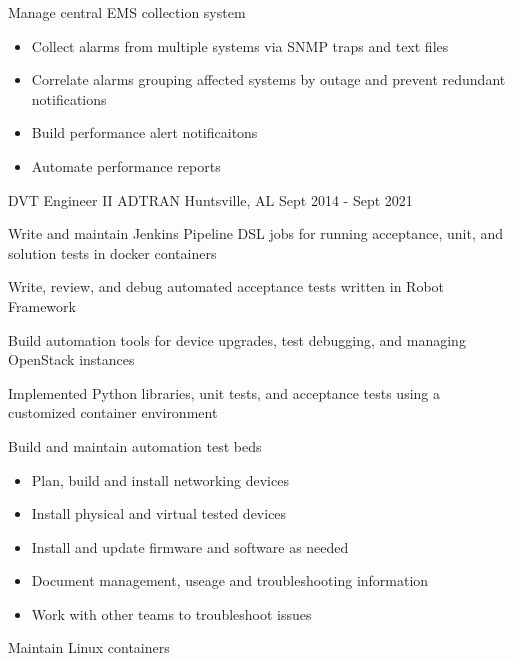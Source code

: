 \begin{cventries}
{\begin{cvitems}
        \item {Manage central EMS collection system}
            \begin{itemize}
                \item {Collect alarms from multiple systems via SNMP traps and text files}
                \item {Correlate alarms grouping affected systems by outage and prevent redundant notifications}
                \item {Build performance alert notificaitons}
                \item {Automate performance reports}
            \end{itemize}
      \end{cvitems}
    }

  \cventry
    {DVT Engineer II} %
    {ADTRAN} %
    {Huntsville, AL} %
    {Sept 2014 - Sept 2021} %
    {
      \begin{cvitems} %
        \item {Write and maintain Jenkins Pipeline DSL jobs for running acceptance, unit, and solution tests in docker containers}
        \item {Write, review, and debug automated acceptance tests written in Robot Framework}
        \item {Build automation tools for device upgrades, test debugging, and managing OpenStack instances}
        \item {Implemented Python libraries, unit tests, and acceptance tests using a customized container environment}
        \item {Build and maintain automation test beds}
            \begin{itemize}
                \item {Plan, build and install networking devices}
                \item {Install physical and virtual tested devices}
                \item {Install and update firmware and software as needed}
                \item {Document management, useage and troubleshooting information}
                \item {Work with other teams to troubleshoot issues}
            \end{itemize}
        \item {Maintain Linux containers}
            \begin{itemize}

\end{itemize}
\end{cvitems}}
\end{cventries}

